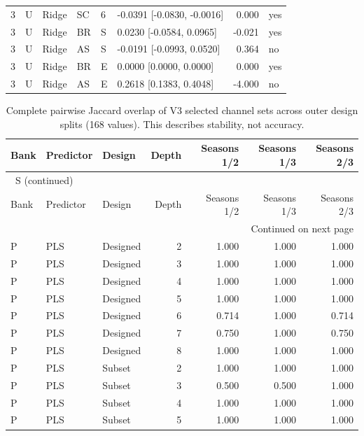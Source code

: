 \documentclass[10pt,a4paper]{article}
\renewcommand{\thetable}{S\arabic{table}}
\begin{document}
\begin{landscape}
\begin{longtable}{rlllllrl}
3 & U & Ridge & SC & 6 & -0.0391 [-0.0830, -0.0016] & 0.000 & yes \\
3 & U & Ridge & BR & S & 0.0230 [-0.0584, 0.0965] & -0.021 & yes \\
3 & U & Ridge & AS & S & -0.0191 [-0.0993, 0.0520] & 0.364 & no \\
3 & U & Ridge & BR & E & 0.0000 [0.0000, 0.0000] & 0.000 & yes \\
3 & U & Ridge & AS & E & 0.2618 [0.1383, 0.4048] & -4.000 & no \\
\end{longtable}
\endgroup
\end{landscape}

\clearpage
\begin{landscape}
\begingroup\footnotesize
\setlength{\tabcolsep}{3.5pt}
\renewcommand{\arraystretch}{1.10}
\begin{longtable}{lllrrrr}
\caption{Complete pairwise Jaccard overlap of V3 selected channel sets across outer design splits (168 values). This describes stability, not accuracy.}\label{tab:stability}\\
\toprule
Bank & Predictor & Design & Depth & Seasons 1/2 & Seasons 1/3 & Seasons 2/3 \\
\midrule
\endfirsthead
\multicolumn{7}{l}{\tablename~\thetable{} (continued)}\\
\toprule
Bank & Predictor & Design & Depth & Seasons 1/2 & Seasons 1/3 & Seasons 2/3 \\
\midrule
\endhead
\midrule
\multicolumn{7}{r}{Continued on next page}\\
\endfoot
\bottomrule
\endlastfoot
P & PLS & Designed & 2 & 1.000 & 1.000 & 1.000 \\
P & PLS & Designed & 3 & 1.000 & 1.000 & 1.000 \\
P & PLS & Designed & 4 & 1.000 & 1.000 & 1.000 \\
P & PLS & Designed & 5 & 1.000 & 1.000 & 1.000 \\
P & PLS & Designed & 6 & 0.714 & 1.000 & 0.714 \\
P & PLS & Designed & 7 & 0.750 & 1.000 & 0.750 \\
P & PLS & Designed & 8 & 1.000 & 1.000 & 1.000 \\
P & PLS & Subset & 2 & 1.000 & 1.000 & 1.000 \\
P & PLS & Subset & 3 & 0.500 & 0.500 & 1.000 \\
P & PLS & Subset & 4 & 1.000 & 1.000 & 1.000 \\
P & PLS & Subset & 5 & 1.000 & 1.000 & 1.000 \\

\end{longtable}
\end{landscape}
\end{document}
